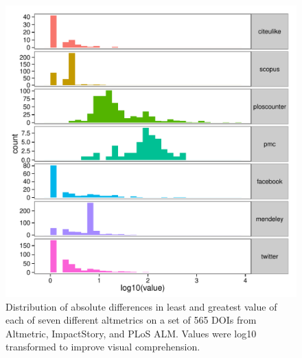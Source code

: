 \documentclass[letterpaper,superscriptaddress,showkeys,longbibliography]{revtex4-1}\usepackage{graphicx, color}
\newenvironment{knitrout}{}{} %
\begin{document}

\begin{knitrout}
\color{fgcolor}\begin{figure}[]


{\centering \includegraphics[width=.7\linewidth]{figure/dataconst_plot1} 

}

\caption[Distribution of absolute differences in least and greatest value of each of seven different altmetrics on a set of 565 DOIs from Altmetric, ImpactStory, and PLoS ALM]{Distribution of absolute differences in least and greatest value of each of seven different altmetrics on a set of 565 DOIs from Altmetric, ImpactStory, and PLoS ALM. Values were log10 transformed to improve visual comprehension.\label{fig:dataconst_plot1}}
\end{figure}


\end{knitrout}
\end{document}
